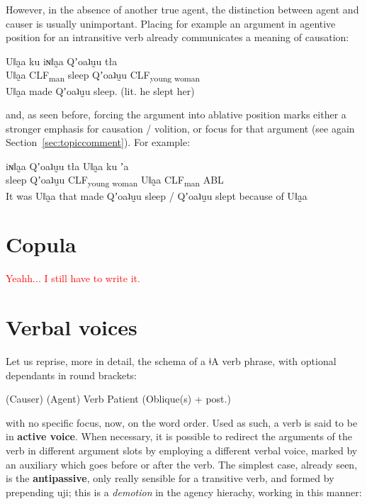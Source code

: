 \documentclass[11pt,a5paper]{book}
\newcommand{\qcn}[1]{\textcolor{AccentText}{\large#1}}
\newcommand{\langname}{\qcn{ǂA}}
\newcommand{\grammsc}[1]{\textsc{#1}}
\newcommand{\CLF}[1]{\grammsc{CLF}\textsubscript{#1}}
\newcommand{\cmnt}[1]{\textcolor{red}{#1}}
\begin{document}
However, in the absence of another true agent, the distinction between agent and causer is usually unimportant. Placing for example an argument in agentive position for an intransitive verb already communicates a meaning of causation:

\begin{exe}
\ex
\gll Uǁa̰a ku iɴǁa̰a Qʼoaʇṵu tła\\
Uǁa̰a \CLF{man} sleep Qʼoaʇṵu \CLF{young woman}\\
\glt Uǁa̰a made Qʼoaʇṵu sleep. (lit. he slept her)
\end{exe}

and, as seen before, forcing the argument into ablative position marks either a stronger emphasis for causation / volition, or focus for that argument (see again Section~\ref{sec:topiccomment}). For example:

\begin{exe}
\ex
\gll iɴǁa̰a Qʼoaʇṵu tła  Uǁa̰a ku ʼa\\
 sleep Qʼoaʇṵu \CLF{young woman} Uǁa̰a \CLF{man} ABL\\
\glt It was Uǁa̰a that made Qʼoaʇṵu sleep / Qʼoaʇṵu slept because of Uǁa̰a
\end{exe}

\section{Copula}\label{sec:copula}

\cmnt{Yeahh... I still have to write it.}

\section{Verbal voices}\label{sec:valencychanging}

Let us reprise, more in detail, the schema of a \langname{} verb phrase, with optional dependants in round brackets:

\begin{center}
(Causer) (Agent) Verb Patient (Oblique(s) + post.)
\end{center}

with no specific focus, now, on the word order. Used as such, a verb is said to be in \textbf{active voice}. When necessary, it is possible to redirect the arguments of the verb in different argument slots by employing a different verbal voice, marked by an auxiliary which goes before or after the verb. The simplest case, already seen, is the \textbf{antipassive}, only really sensible for a transitive verb, and formed by prepending \qcn{uji}; this is a \emph{demotion} in the agency hierachy, working in this manner:
\end{document}
